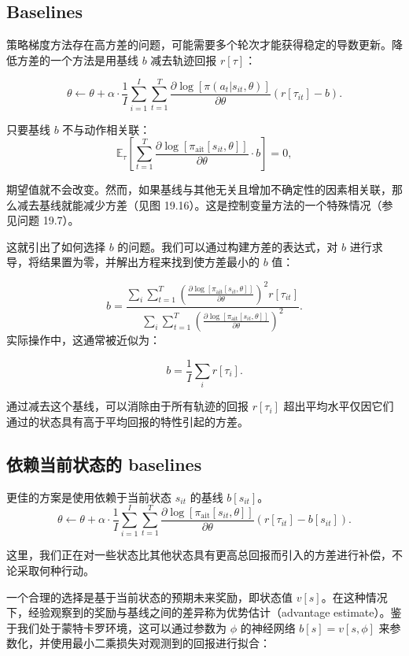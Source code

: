 \subsection{Baselines}
策略梯度方法存在高方差的问题，可能需要多个轮次才能获得稳定的导数更新。降低方差的一个方法是用基线 \(b\) 减去轨迹回报 \(r[\tau]\)：

\[
\theta \leftarrow \theta + \alpha \cdot \frac{1}{I} \sum_{i=1}^{I} \sum_{t=1}^{T} \frac{\partial \log [\pi(a_t|s_{it}, \theta)]}{\partial \theta} (r[\tau_{it}] - b). \tag{19.34}
\]

只要基线 \(b\) 不与动作相关联：
\[
\mathbb{E}_{\tau}\left[ \sum_{t=1}^T \frac{\partial \log[\pi_{\text{ait}}[s_{it}, \theta]]}{\partial \theta} \cdot b \right] = 0, \tag{19.35}
\]

期望值就不会改变。然而，如果基线与其他无关且增加不确定性的因素相关联，那么减去基线就能减少方差（见图 19.16）。这是控制变量方法的一个特殊情况（参见问题 19.7）。

这就引出了如何选择 \(b\) 的问题。我们可以通过构建方差的表达式，对 \(b\) 进行求导，将结果置为零，并解出方程来找到使方差最小的 \(b\) 值：

\[
b = \frac{\sum_{i} \sum_{t=1}^T (\frac{\partial \log[\pi_{\text{ait}}[s_{it}, \theta]]}{\partial \theta})^2 r[\tau_{it}]}{\sum_{i} \sum_{t=1}^T (\frac{\partial \log[\pi_{\text{ait}}[s_{it}, \theta]]}{\partial \theta})^2 }. \tag{19.36}
\]
实际操作中，这通常被近似为：

\[
b = \frac{1}{I} \sum_{i} r[\tau_{i}]. \tag{19.37}
\]

通过减去这个基线，可以消除由于所有轨迹的回报 \(r[\tau_i]\) 超出平均水平仅因它们通过的状态具有高于平均回报的特性引起的方差。

\subsection{依赖当前状态的 baselines}
更佳的方案是使用依赖于当前状态 \(s_{it}\) 的基线 \(b[s_{it}]\)。
\[
\theta \leftarrow \theta + \alpha \cdot \frac{1}{I} \sum_{i=1}^{I} \sum_{t=1}^{T} \frac{\partial \log[\pi_{\text{ait}}[s_{it}, \theta]]}{\partial \theta} (r[\tau_{it}] - b[s_{it}]). \tag{19.38}
\]

这里，我们正在对一些状态比其他状态具有更高总回报而引入的方差进行补偿，不论采取何种行动。

一个合理的选择是基于当前状态的预期未来奖励，即状态值 \(v[s]\)。在这种情况下，经验观察到的奖励与基线之间的差异称为优势估计（advantage estimate）。鉴于我们处于蒙特卡罗环境，这可以通过参数为 \(\phi\) 的神经网络 \(b[s] = v[s, \phi]\) 来参数化，并使用最小二乘损失对观测到的回报进行拟合：

